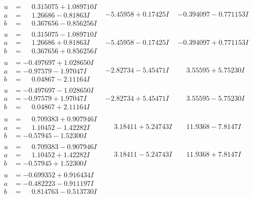 \documentclass[1p]{elsarticle_modified}
\theoremstyle{definition}
\begin{document}
$$\begin{array}{c|c|c}
\begin{aligned}
u &= \phantom{-}0.315075 + 1.089710 I \\
a &= \phantom{-}1.26686 - 0.81863 I \\
b &= \phantom{-}0.367656 - 0.856256 I\end{aligned}
 & -5.45958 + 0.17425 I & -0.394097 - 0.771153 I \\ \hline\begin{aligned}
u &= \phantom{-}0.315075 - 1.089710 I \\
a &= \phantom{-}1.26686 + 0.81863 I \\
b &= \phantom{-}0.367656 + 0.856256 I\end{aligned}
 & -5.45958 - 0.17425 I & -0.394097 + 0.771153 I \\ \hline\begin{aligned}
u &= -0.497697 + 1.028650 I \\
a &= -0.97579 - 1.97047 I \\
b &= \phantom{-}0.04867 - 2.11164 I\end{aligned}
 & -2.82734 - 5.45471 I & \phantom{-}3.55595 + 5.75230 I \\ \hline\begin{aligned}
u &= -0.497697 - 1.028650 I \\
a &= -0.97579 + 1.97047 I \\
b &= \phantom{-}0.04867 + 2.11164 I\end{aligned}
 & -2.82734 + 5.45471 I & \phantom{-}3.55595 - 5.75230 I \\ \hline\begin{aligned}
u &= \phantom{-}0.709383 + 0.907946 I \\
a &= \phantom{-}1.10452 - 1.42282 I \\
b &= -0.57945 - 1.52300 I\end{aligned}
 & \phantom{-}3.18411 + 5.24743 I & \phantom{-}11.9368 - 7.8147 I \\ \hline\begin{aligned}
u &= \phantom{-}0.709383 - 0.907946 I \\
a &= \phantom{-}1.10452 + 1.42282 I \\
b &= -0.57945 + 1.52300 I\end{aligned}
 & \phantom{-}3.18411 - 5.24743 I & \phantom{-}11.9368 + 7.8147 I \\ \hline\begin{aligned}
u &= -0.699352 + 0.916434 I \\
a &= -0.482223 - 0.911197 I \\
b &= \phantom{-}0.814763 - 0.513730 I\end{aligned}

\end{array}$$
\end{document}
